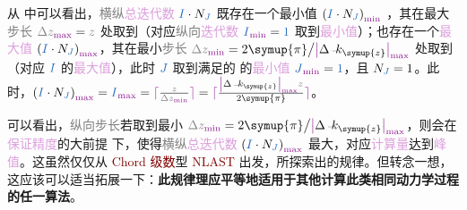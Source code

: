 从  中可以看出，\textcolor{gray}{横纵}\textcolor{Plum}{总迭代数} $\textcolor{NavyBlue}{I} \cdot N_{\textcolor{NavyBlue}{J}}$ 既存在一个最小值 $\left( \textcolor{NavyBlue}{I} \cdot N_{\textcolor{NavyBlue}{J}} \right)_{\textcolor{Plum}{\min}}$ ，其在最大\textcolor{gray}{步长} $\mathcolor{gray}{\Delta z}_{\textcolor{Plum}{\max}} = \mathcolor{gray}{z}$ 处取到（对应\textcolor{gray}{纵向}\textcolor{Plum}{迭代数} $\textcolor{NavyBlue}{I}_{\textcolor{Plum}{\min}} = \textcolor{NavyBlue}{1}$ 取到\textcolor{Plum}{最小值}）；也存在一个\textcolor{Plum}{最大值} $\left( \textcolor{NavyBlue}{I} \cdot N_{\textcolor{NavyBlue}{J}} \right)_{\textcolor{Plum}{\max}}$，其在最小\textcolor{gray}{步长} $\mathcolor{gray}{\Delta z}_{\textcolor{Plum}{\min}} = 2 \symup{\pi} \big/ \textcolor{Plum}{\left| \textcolor{black}{\Delta \xint{\begin{smallmatrix} ~ \\ {}^{}_{\mathcolor{gray}{-}} \\ ~ \end{smallmatrix}}{15}{k}_{\symup{z}} } \right|_{\max}}$ 处取到（对应 $\textcolor{NavyBlue}{I}$ 的\textcolor{Plum}{最大值}），此时 $\textcolor{NavyBlue}{J}$ 取到满足的  的\textcolor{Plum}{最小值} $\textcolor{NavyBlue}{J}_{\textcolor{Plum}{\min}} = \textcolor{NavyBlue}{1}$，且 $N_{\textcolor{NavyBlue}{J}} = 1$。此时，$\left( \textcolor{NavyBlue}{I} \cdot N_{\textcolor{NavyBlue}{J}} \right)_{\textcolor{Plum}{\max}} = \textcolor{NavyBlue}{I}_{\textcolor{Plum}{\max}} = \textcolor{Plum}{\lceil \textcolor{black}{\frac{\mathcolor{gray}{z}}{\mathcolor{gray}{\Delta z}_{\textcolor{Plum}{\min}}}} \rceil} = \textcolor{Plum}{\lceil \textcolor{black}{\frac{\textcolor{Plum}{\left| \textcolor{black}{\Delta \xint{\begin{smallmatrix} ~ \\ {}^{}_{\mathcolor{gray}{-}} \\ ~ \end{smallmatrix}}{15}{k}_{\symup{z}} } \right|_{\max}} \mathcolor{gray}{z}}{2 \symup{\pi}}} \rceil}$。

可以看出，\textcolor{gray}{纵向}\textcolor{gray}{步长}若取到最小 $\mathcolor{gray}{\Delta z}_{\textcolor{Plum}{\min}} = 2 \symup{\pi} \big/ \textcolor{Plum}{\left| \textcolor{black}{\Delta \xint{\begin{smallmatrix} ~ \\ {}^{}_{\mathcolor{gray}{-}} \\ ~ \end{smallmatrix}}{15}{k}_{\symup{z}} } \right|_{\max}}$，则会在\textcolor{Plum}{保证精度}的大前提  下，使得\textcolor{gray}{横纵}\textcolor{Plum}{总迭代数} $\left( \textcolor{NavyBlue}{I} \cdot N_{\textcolor{NavyBlue}{J}} \right)_{\textcolor{Plum}{\max}}$ 最大，对应\textcolor{Plum}{计算量}达到\textcolor{Plum}{峰值}。这虽然仅仅从 \textcolor{Maroon}{Chord 级数}型 \textcolor{Maroon}{NLAST} 出发，所探索出的规律。但转念一想，这应该可以适当拓展一下：\textbf{此规律理应平等地适用于其他计算此类相同动力学过程的任一算法}。

